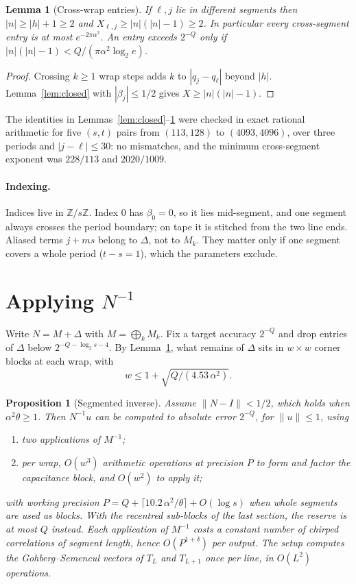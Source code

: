 \documentclass[11pt]{article}
\newtheorem{lemma}{Lemma}
\newtheorem{proposition}{Proposition}
\theoremstyle{remark}\newtheorem*{remark}{Remark}
\begin{document}
\begin{lemma}[Cross-wrap entries]\label{lem:cross}
If $\ell,j$ lie in different segments then $|n|\ge|h|+1\ge2$ and
$X_{\ell,j}\ge|n|(|n|-1)\ge2$. In particular every cross-segment entry is at most
$e^{-2\pi\alpha^2}$. An entry exceeds $2^{-Q}$ only if $|n|(|n|-1)<Q/(\pi\alpha^2\log_2e)$.
\end{lemma}
\begin{proof}
Crossing $k\ge1$ wrap steps adds $k$ to $|q_j-q_\ell|$ beyond $|h|$. Lemma~\ref{lem:closed}
with $|\beta_j|\le1/2$ gives $X\ge|n|(|n|-1)$.
\end{proof}

The identities in Lemmas~\ref{lem:closed}--\ref{lem:cross} were checked in exact rational
arithmetic for five $(s,t)$ pairs from $(113,128)$ to $(4093,4096)$, over three periods and $|j-\ell|\le30$:
no mismatches, and the minimum cross-segment exponent was $228/113$ and $2020/1009$.

\paragraph{Indexing.} Indices live in $\mathbb Z/s\mathbb Z$. Index $0$ has $\beta_0=0$, so it lies mid-segment, and one segment always crosses the period boundary; on tape it is stitched from the two line ends. Aliased terms $j+ms$ belong to $\Delta$, not to $M_k$. They matter only if one segment covers a whole period ($t-s=1$), which the parameters exclude.

\section{Applying $N^{-1}$}

Write $N=M+\Delta$ with $M=\bigoplus_kM_k$. Fix a target accuracy $2^{-Q}$ and drop
entries of $\Delta$ below $2^{-Q-\log_2 s-4}$. By Lemma~\ref{lem:cross}, what remains of
$\Delta$ sits in $w\times w$ corner blocks at each wrap, with
\[
 w\le1+\sqrt{Q/(4.53\,\alpha^2)} .
\]

\begin{proposition}[Segmented inverse]\label{prop:inverse}
Assume $\|N-I\|<1/2$, which holds when $\alpha^2\theta\ge1$. Then $N^{-1}u$ can be computed
to absolute error $2^{-Q}$, for $\|u\|\le1$, using
\begin{enumerate}
\item two applications of $M^{-1}$;
\item per wrap, $O(w^3)$ arithmetic operations at precision $P$ to form and factor the
capacitance block, and $O(w^2)$ to apply it;
\end{enumerate}
with working precision $P=Q+\lceil10.2\,\alpha^2/\theta\rceil+O(\log s)$ when whole segments are used as blocks. With the recentred sub-blocks of the last section, the reserve is at most $Q$ instead.
Each application of $M^{-1}$ costs a constant number of chirped correlations of segment
length, hence $O(P^{1+\delta})$ per output. The setup computes the Gohberg--Semencul
vectors of $T_L$ and $T_{L+1}$ once per line, in $O(L^2)$ operations.
\end{proposition}
\end{document}
